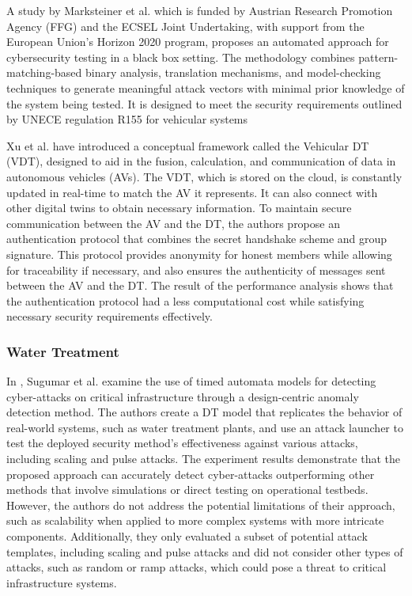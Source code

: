 A study by Marksteiner et al. \cite{marksteinerUsingCyberDigital2021} which is funded by Austrian Research Promotion Agency (FFG) and the ECSEL Joint Undertaking, with support from the European Union's Horizon 2020 program, proposes an automated approach for cybersecurity testing in a black box setting. The methodology combines pattern-matching-based binary analysis, translation mechanisms, and model-checking techniques to generate meaningful attack vectors with minimal prior knowledge of the system being tested. It is designed to meet the security requirements outlined by UNECE regulation R155 for vehicular systems  

Xu et al.\cite{xuEfficientAuthenticationVehicular2021} have introduced a conceptual framework called the Vehicular DT (VDT), designed to aid in the fusion, calculation, and communication of data in autonomous vehicles (AVs). The VDT, which is stored on the cloud, is constantly updated in real-time to match the AV it represents. It can also connect with other digital twins to obtain necessary information. To maintain secure communication between the AV and the DT, the authors propose an authentication protocol that combines the secret handshake scheme and group signature. This protocol provides anonymity for honest members while allowing for traceability if necessary, and also ensures the authenticity of messages sent between the AV and the DT. The result of the performance analysis shows that the authentication protocol had a less computational cost while satisfying necessary security requirements effectively. 

\subsubsection{Water Treatment}
In \cite{sugumarAssessmentMethodDetecting2019}, Sugumar et al. examine the use of timed automata models for detecting cyber-attacks on critical infrastructure through a design-centric anomaly detection method. The authors create a DT model that replicates the behavior of real-world systems, such as water treatment plants, and use an attack launcher to test the deployed security method's effectiveness against various attacks, including scaling and pulse attacks. The experiment results demonstrate that the proposed approach can accurately detect cyber-attacks outperforming other methods that involve simulations or direct testing on operational testbeds. However, the authors do not address the potential limitations of their approach, such as scalability when applied to more complex systems with more intricate components. Additionally, they only evaluated a subset of potential attack templates, including scaling and pulse attacks and did not consider other types of attacks, such as random or ramp attacks, which could pose a threat to critical infrastructure systems. 

